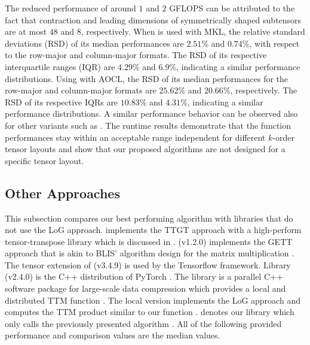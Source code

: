 The reduced performance of around $1$ and $2$ GFLOPS can be attributed to the fact that contraction and leading dimensions of symmetrically shaped subtensors are at most $48$ and $8$, respectively.
When  is used with MKL, the relative standard deviations (RSD) of its median performances are $2.51$\% and $0.74$\%, with respect to the row-major and column-major formats.
The RSD of its respective interquartile ranges (IQR) are $4.29$\% and $6.9$\%, indicating a similar performance distributions.
Using  with AOCL, the RSD of its median performances for the row-major and column-major formats are $25.62$\% and $20.66$\%, respectively.
The RSD of its respective IQRs are $10.83$\% and $4.31$\%, indicating a similar performance distributions.
A similar performance behavior can be observed also for other  variants such as .
The runtime results demonstrate that the function performances stay within an acceptable range independent for different $k$-order tensor layouts and show that our proposed algorithms are not designed for a specific tensor layout.

\subsection{Other Approaches}
This subsection compares our best performing algorithm with libraries that do not use the LoG approach.
 implements the TTGT approach with a high-perform tensor-transpose library  which is discussed in \cite{springer:2018:design}.
 (v1.2.0) implements the GETT approach that is akin to BLIS' algorithm design for the matrix multiplication \cite{matthews:2018:high}.
The tensor extension of  (v3.4.9) is used by the Tensorflow framework.
Library  (v2.4.0) is the C++ distribution of PyTorch \cite{paszke:2019:pytorch}.
The  library is a parallel C++ software package for large-scale data compression which provides a local and distributed TTM function \cite{ballard:2020:tuckermpi}.
The local version implements the LoG approach and computes the TTM product similar to our function .
 denotes our library which only calls the previously presented algorithm .
All of the following provided performance and comparison values are the median values.

